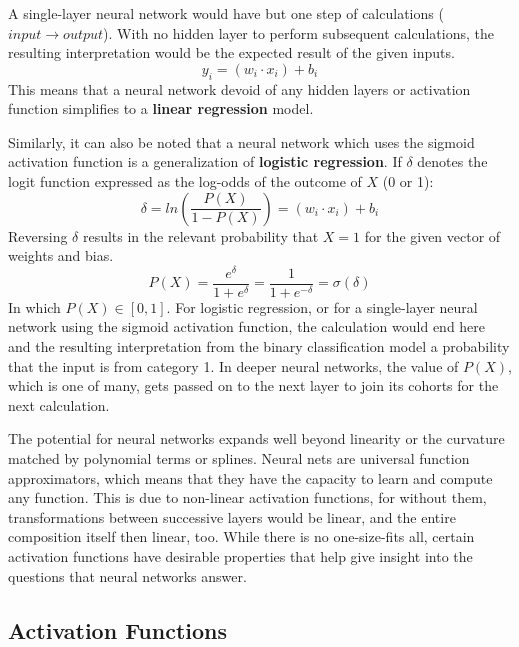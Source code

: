 A single-layer neural network would have but one step of calculations ($input \rightarrow output$).  With no hidden layer to perform subsequent calculations, the resulting interpretation would be the expected result of the given inputs.
$$
y_i = (w_i \cdot x_i) + b_i
$$
This means that a neural network devoid of any hidden layers or activation function simplifies to a \textbf{linear regression} model. \cite{sharma2017activation}




Similarly, it can also be noted that a neural network which uses the sigmoid activation function is a generalization of \textbf{logistic regression}. \cite{dreiseitl2002logistic} \cite{schumacher1996neural}  If $\delta$ denotes the logit function expressed as the log-odds of the outcome of $X$ (0 or 1):
$$
\delta = ln \left( \frac{P(X)}{1-P(X)} \right) = (w_i \cdot x_i) + b_i 
$$
Reversing $\delta$ results in the relevant probability that $X = 1$ for the given vector of weights and bias.
$$
P(X) = \frac{e^\delta}{1+e^\delta} = \frac{1}{1+e^{-\delta}} = \sigma(\delta)
$$
In which $P(X) \in [0,1]$.  For logistic regression, or for a single-layer neural network using the sigmoid activation function, the calculation would end here and the resulting interpretation from the binary classification model a probability that the input is from category 1.  In deeper neural networks, the value of $P(X)$, which is one of many, gets passed on to the next layer to join its cohorts for the next calculation.

The potential for neural networks expands well beyond linearity or the curvature matched by polynomial terms or splines.  Neural nets are universal function approximators, which means that they have the capacity to learn and compute any function. \cite{sharma2017activation} This is due to non-linear activation functions, for without them, transformations between successive layers would be linear, and the entire composition itself then linear, too. \cite{bishop1995}  While there is no one-size-fits all, certain activation functions have desirable properties that help give insight into the questions that neural networks answer.





\hypertarget{activation-functions}{%
\subsection{Activation Functions}\label{activation-functions}}

